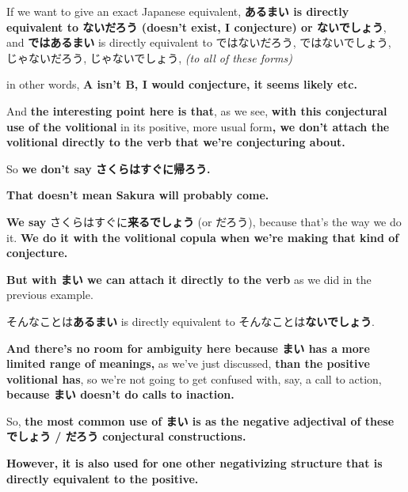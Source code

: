 \startsectionlevel[title={An exact Japanese equivalent to あるまい},reference={an-exact-japanese-equivalent-to-あるまい}]

If we want to give an exact Japanese equivalent, {\bf あるまい is directly equivalent to ないだろう\crlf
(doesn't exist, I conjecture) or ないでしょう}, and {\bf ではあるまい} is directly equivalent to ではないだろう, ではないでしょう, じゃないだろう, じゃないでしょう, {\em (to all of these forms)}

{}

in other words, {\bf A isn't B, I would conjecture, it seems likely etc.}

And {\bf the interesting point here is that}, as we see, {\bf with this conjectural use of the volitional }in its positive, more usual form{\bf , we don't attach the volitional directly to the verb that we're conjecturing about.}

So {\bf we don't say さくらはすぐに帰ろう.}

{\bf That doesn't mean Sakura will probably come.}

{\bf We say} さくらはすぐに{\bf 来るでしょう} (or だろう), because that's the way we do it. {\bf We do it with the volitional copula when we're making that kind of conjecture.}

\thinrule

{\bf But with まい we can attach it directly to the verb} as we did in the previous example.

そんなことは{\bf あるまい} is directly equivalent to そんなことは{\bf ないでしょう}.

{\bf And there's no room for ambiguity here because まい has a more limited range of meanings,} as we've just discussed, {\bf than the positive volitional has}, so we're not going to get confused with, say, a call to action, {\bf because まい doesn't do calls to inaction.}

So, {\bf the most common use of まい is as the negative adjectival of these でしょう / だろう conjectural constructions.}

\stopsectionlevel

\stopsectionlevel

\startsectionlevel[title={まい used for a strong decision or determination not to do something},reference={まい-used-for-a-strong-decision-or-determination-not-to-do-something}]

{\bf However, it is also used for one other negativizing structure that is directly equivalent to the positive.}


